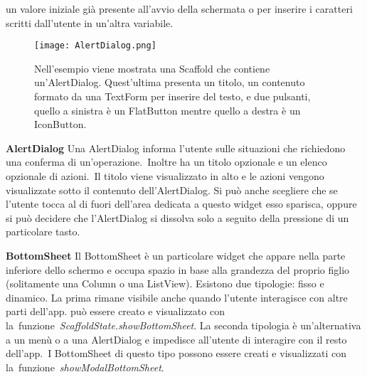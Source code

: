 \begin{trivlist}
		un valore iniziale già presente all'avvio della schermata o per inserire
		i caratteri scritti dall'utente in un'altra variabile.
		\begin{figure}
			\centering
			\texttt{[image: AlertDialog.png]}			
			\caption{Nell'esempio viene mostrata una Scaffold che contiene
			un'AlertDialog. Quest'ultima presenta un titolo, un contenuto
			formato da una TextForm per inserire del testo, e due pulsanti,
			quello a sinistra è un FlatButton mentre quello a destra è un IconButton.}
		\end{figure}
		\item \textbf{AlertDialog} \newline
		Una AlertDialog informa l'utente sulle situazioni che richiedono una
		conferma di un'operazione. Inoltre ha un titolo opzionale e un
		elenco opzionale di azioni. Il titolo viene visualizzato in alto e le
		azioni vengono visualizzate sotto il contenuto dell’AlertDialog. Si può
		anche scegliere che se l'utente tocca al di fuori dell'area dedicata a
		questo widget esso sparisca, oppure si può decidere che l'AlertDialog si
		dissolva solo a seguito della pressione di un particolare tasto.
		\item \textbf{BottomSheet} \newline
		Il BottomSheet è un particolare widget che appare nella parte inferiore
		dello schermo e occupa spazio in base alla grandezza del proprio figlio
		(solitamente una Column o una ListView). Esistono due tipologie: fisso e
		dinamico. La prima rimane visibile anche quando l'utente interagisce con
		altre parti dell'app. può essere creato e visualizzato  con
		la funzione \textit{ScaffoldState.showBottomSheet}. La seconda tipologia
		è un'alternativa a un menù o a una AlertDialog e impedisce all'utente di
		interagire con il resto dell'app. I BottomSheet di questo tipo possono
		essere creati e visualizzati con
		la funzione \textit{showModalBottomSheet}.
	\end{trivlist}

